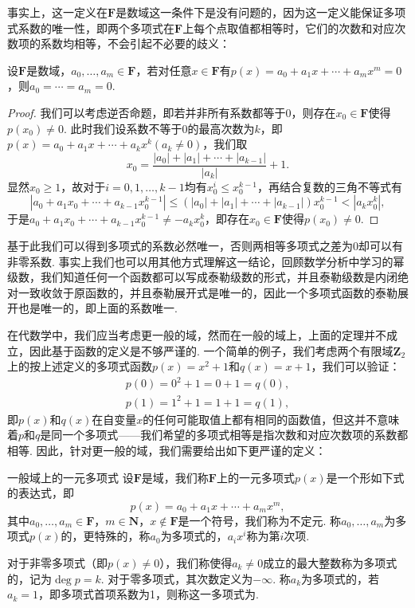 事实上，这一定义在$\mathbf{F}$是数域这一条件下是没有问题的，因为这一定义能保证多项式系数的唯一性，即两个多项式在$\mathbf{F}$上每个点取值都相等时，它们的次数和对应次数项的系数均相等，不会引起不必要的歧义：
\begin{theorem}{}{}
    设$\mathbf{F}$是数域，$a_0,\ldots,a_m\in\mathbf{F}$，若对任意$x\in\mathbf{F}$有$p(x)=a_0+a_1x+\cdots+a_mx^m=0$，则$a_0=\cdots=a_m=0$.
\end{theorem}
\begin{proof}
    我们可以考虑逆否命题，即若并非所有系数都等于$0$，则存在$x_0\in\mathbf{F}$使得$p(x_0)\neq 0$. 此时我们设系数不等于$0$的最高次数为$k$，即$p(x)=a_0+a_1x+\cdots+a_kx^k(a_k\neq 0)$，我们取
    \[x_0=\dfrac{|a_0|+|a_1|+\cdots+|a_{k-1}|}{|a_k|}+1.\]
    显然$x_0\geqslant 1$，故对于$i=0,1,\ldots,k-1$均有$x_0^i\leqslant x_0^{k-1}$，再结合复数的三角不等式有
    \[|a_0+a_1x_0+\cdots+a_{k-1}x_0^{k-1}|\leqslant(|a_0|+|a_1|+\cdots+|a_{k-1}|)x_0^{k-1}<|a_kx_0^k|,\]
    于是$a_0+a_1x_0+\cdots+a_{k-1}x_0^{k-1}\neq -a_kx_0^k$，即存在$x_0\in\mathbf{F}$使得$p(x_0)\neq 0$.
\end{proof}
基于此我们可以得到多项式的系数必然唯一，否则两相等多项式之差为$0$却可以有非零系数. 事实上我们也可以用其他方式理解这一结论，回顾数学分析中学习的幂级数，我们知道任何一个函数都可以写成泰勒级数的形式，并且泰勒级数是内闭绝对一致收敛于原函数的，并且泰勒展开式是唯一的，因此一个多项式函数的泰勒展开也是唯一的，即上面的系数唯一.

在代数学中，我们应当考虑更一般的域，然而在一般的域上，上面的定理并不成立，因此基于函数的定义是不够严谨的. 一个简单的例子，我们考虑两个有限域$\mathbf{Z}_2$上的按上述定义的多项式函数$p(x)=x^2+1$和$q(x)=x+1$，我们可以验证：
\begin{gather*}
    p(0)=0^2+1=0+1=q(0),\\
    p(1)=1^2+1=1+1=q(1),
\end{gather*}
即$p(x)$和$q(x)$在自变量$x$的任何可能取值上都有相同的函数值，但这并不意味着$p$和$q$是同一个多项式——我们希望的多项式相等是指次数和对应次数项的系数都相等. 因此，针对更一般的域，我们需要给出如下更严谨的定义：
\begin{definition}{一般域上的一元多项式}{}
    设$\mathbf{F}$是域，我们称$\mathbf{F}$上的一元多项式$p(x)$是一个形如下式的表达式，即
    \begin{equation} \label{eq:17:多项式定义}
        p(x)=a_0+a_1x+\cdots+a_mx^m,
    \end{equation}
    其中$a_0,\ldots,a_m\in\mathbf{F}$，$m\in\mathbf{N}$，$x\notin \mathbf{F}$是一个符号，我们称为不定元. 称$a_0,\ldots,a_m$为多项式$p(x)$的，更特殊的，称$a_0$为多项式的，$a_ix^i$称为第$i$次项.

    对于非零多项式（即$p(x)\neq 0$），我们称使得$a_k\neq 0$成立的最大整数称为多项式的，记为$\deg p=k$. 对于零多项式，其次数定义为$-\infty$. 称$a_k$为多项式的，若$a_k=1$，即多项式首项系数为1，则称这一多项式为.
\end{definition}

